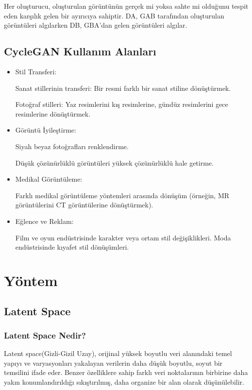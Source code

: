 \documentclass[12pt, a4paper]{article}
\begin{document}
	Her oluşturucu, oluşturulan görüntünün gerçek mi yoksa sahte mi olduğunu tespit eden karşılık gelen bir ayırıcıya sahiptir. DA, GAB tarafından oluşturulan görüntüleri algılarken DB, GBA'dan gelen görüntüleri algılar.
	
	
	\subsection{CycleGAN Kullanım Alanları}
	\begin{itemize}
		\item Stil Transferi:
		
		Sanat stillerinin transferi: Bir resmi farklı bir sanat stiline dönüştürmek.
		
		Fotoğraf stilleri: Yaz resimlerini kış resimlerine, gündüz resimlerini gece resimlerine dönüştürmek.
		
		\item Görüntü İyileştirme:
		
		Siyah beyaz fotoğrafları renklendirme.
		
		Düşük çözünürlüklü görüntüleri yüksek çözünürlüklü hale getirme.
		
		\item Medikal Görüntüleme:
		
		Farklı medikal görüntüleme yöntemleri arasında dönüşüm (örneğin, MR görüntülerini CT görüntülerine dönüştürmek).
		
		\item Eğlence ve Reklam:
		
		Film ve oyun endüstrisinde karakter veya ortam stil değişiklikleri.
		Moda endüstrisinde kıyafet stil dönüşümleri\cite{Cycle-2024-05-22}.
		
	\end{itemize}
		\clearpage
	\section{Yöntem}
	
	\subsection{Latent Space}
	\subsubsection{Latent Space Nedir?}
	Latent space(Gizli-Gizil Uzay), orijinal yüksek boyutlu veri alanındaki temel yapıyı ve varyasyonları yakalayan verilerin daha düşük boyutlu, soyut bir temsilini ifade eder. Benzer özelliklere sahip farklı veri noktalarının birbirine daha yakın konumlandırıldığı sıkıştırılmış, daha organize bir alan olarak düşünülebilir.
	
\end{document}
